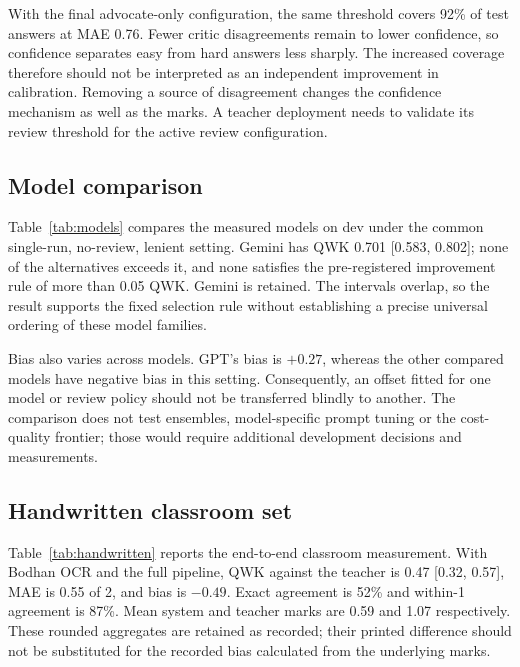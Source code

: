 With the final advocate-only configuration, the same threshold covers 92\% of test answers at MAE 0.76. Fewer critic disagreements remain to lower confidence, so confidence separates easy from hard answers less sharply. The increased coverage therefore should not be interpreted as an independent improvement in calibration. Removing a source of disagreement changes the confidence mechanism as well as the marks. A teacher deployment needs to validate its review threshold for the active review configuration.

\subsection{Model comparison}
Table~\ref{tab:models} compares the measured models on dev under the common single-run, no-review, lenient setting. Gemini has QWK 0.701 [0.583, 0.802]; none of the alternatives exceeds it, and none satisfies the pre-registered improvement rule of more than 0.05 QWK. Gemini is retained. The intervals overlap, so the result supports the fixed selection rule without establishing a precise universal ordering of these model families.

\begin{table}[htbp]
\centering
\caption{Model comparison on SPRAG dev ($n=115$); 95\% question-clustered intervals. Selection uses the pre-registered 0.05 QWK rule.}
\label{tab:models}
\end{table}

Bias also varies across models. GPT's bias is $+0.27$, whereas the other compared models have negative bias in this setting. Consequently, an offset fitted for one model or review policy should not be transferred blindly to another. The comparison does not test ensembles, model-specific prompt tuning or the cost-quality frontier; those would require additional development decisions and measurements.

\subsection{Handwritten classroom set}
Table~\ref{tab:handwritten} reports the end-to-end classroom measurement. With Bodhan OCR and the full pipeline, QWK against the teacher is 0.47 [0.32, 0.57], MAE is 0.55 of 2, and bias is $-0.49$. Exact agreement is 52\% and within-1 agreement is 87\%. Mean system and teacher marks are 0.59 and 1.07 respectively. These rounded aggregates are retained as recorded; their printed difference should not be substituted for the recorded bias calculated from the underlying marks.

